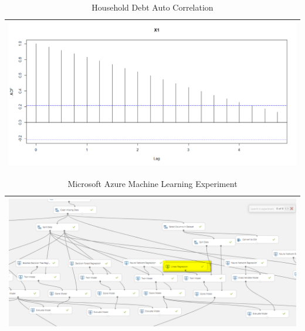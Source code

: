 \documentclass[sigconf,nonacm,11pt]{acmart}
\begin{document}
\begin{appendix}
\begin{table}[ht]
\caption{Household Debt Auto Correlation}
\centering
\begin{tabular}{p{1.0\linewidth}}
\hline
\includegraphics[scale = 0.26]{HouseholdDebtAutoCor.png}\\
\hline
\end{tabular}
\end{table}



\begin{table}[ht]
\caption{Microsoft Azure Machine Learning Experiment}
\centering
\begin{tabular}{p{1.0\linewidth}}
\hline
\includegraphics[scale = 0.46]{teamfed_azure_ml.png}\\
\hline
\end{tabular}
\end{table}



\end{appendix}
\end{document}
